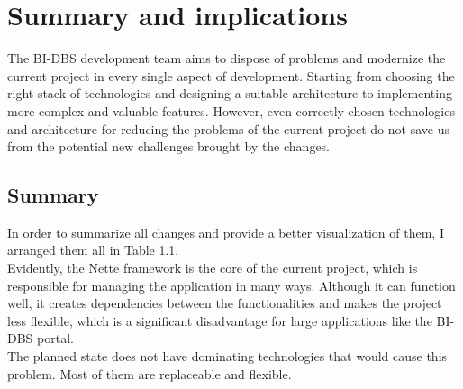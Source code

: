 \section{Summary and implications} The BI-DBS development team aims to dispose of problems and modernize the current project in every single aspect of development. Starting from choosing the right stack of technologies and designing a suitable architecture to implementing more complex and valuable features. However, even correctly chosen technologies and architecture for reducing the problems of the current project do not save us from the potential new challenges brought by the changes. 


\subsection{Summary} 
In order to summarize all changes and provide a better visualization of them, I arranged them all in Table 1.1.\\
Evidently, the Nette framework is the core of the current project, which is responsible for managing the application in many ways. Although it can function well, it creates dependencies between the functionalities and makes the project less flexible, which is a significant disadvantage for large applications like the BI-DBS portal.\\
The planned state does not have dominating technologies that would cause this problem. Most of them are replaceable and flexible.





